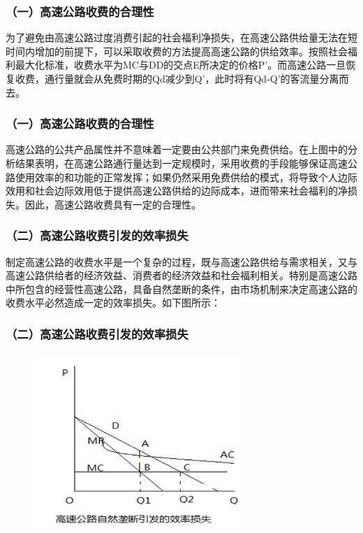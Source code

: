 \documentclass[aspectratio=169, 12pt]{beamer}
\begin{document}
\begin{frame}[plain]
    \frametitle{（一）高速公路收费的合理性}
    为了避免由高速公路过度消费引起的社会福利净损失，在高速公路供给量无法在短时间内增加的前提下，可以采取收费的方法提高高速公路的供给效率。按照社会福利最大化标准，收费水平为MC与DD的交点E所决定的价格P’。而高速公路一旦恢复收费，通行量就会从免费时期的Qd减少到Q’，此时将有Qd-Q’的客流量分离而去。
\end{frame}

\begin{frame}[plain]
    \frametitle{（一）高速公路收费的合理性}
    高速公路的公共产品属性并不意味着一定要由公共部门来免费供给。在上图中的分析结果表明，在高速公路通行量达到一定规模时，采用收费的手段能够保证高速公路使用效率的和功能的正常发挥；如果仍然采用免费供给的模式，将导致个人边际效用和社会边际效用低于提供高速公路供给的边际成本，进而带来社会福利的净损失。因此，高速公路收费具有一定的合理性。
\end{frame}

\begin{frame}[plain]
    \frametitle{（二）高速公路收费引发的效率损失}
    制定高速公路的收费水平是一个复杂的过程，既与高速公路供给与需求相关，又与高速公路供给者的经济效益、消费者的经济效益和社会福利相关。特别是高速公路中所包含的经营性高速公路，具备自然垄断的条件，由市场机制来决定高速公路的收费水平必然造成一定的效率损失。如下图所示：
\end{frame}

\begin{frame}[plain]
    \frametitle{（二）高速公路收费引发的效率损失}
    \begin{figure}
        \centering
            \includegraphics[width=0.7\textwidth]{./resources/figure/loss.png}
        \end{figure}
\end{frame}
\end{document}

